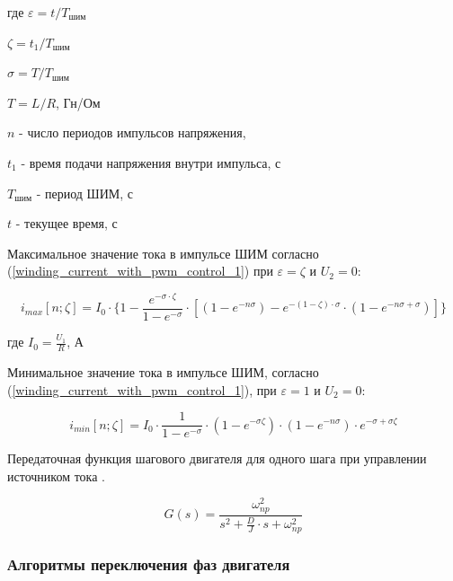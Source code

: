 где $\varepsilon = t / T_\textit{шим}$

$\zeta = t_{1} / T_\textit{шим}$

$\sigma = T / T_\textit{шим}$

$T = L / R$, Гн/Ом

$n$ - число периодов импульсов напряжения,

$t_{1}$ - время подачи напряжения внутри импульса, с

$T_\textit{шим}$ - период ШИМ, с

$t$ - текущее время, с

Максимальное значение тока в импульсе ШИМ согласно (\ref{winding_current_with_pwm_control_1}) при
$\varepsilon = \zeta$ и $U_{2} = 0$:

\begin{equation}
    \label{max_current_in_the_n_pwm_pulse}
    i_{max}[n; \zeta] =
        I_{0}
            \cdot \{ 1
                     - \frac{ e^{-\sigma \cdot \zeta} }{ 1 - e^{-\sigma} }
                       \cdot [ (1 - e^{-n\sigma})
                               - e^{ -(1 - \zeta) \cdot \sigma }
                                    \cdot ( 1 - e^{-n\sigma + \sigma} )
                             ]
                  \}
\end{equation}

где $I_{0} = \frac{ U_{1} }{ R }$, А

Минимальное значение тока в импульсе ШИМ, согласно (\ref{winding_current_with_pwm_control_1}), при
$\varepsilon = 1$ и $U_{2} = 0$:

\begin{equation}
    \label{min_current_in_the_n_pwm_pulse}
    i_{min}[n; \zeta] =
        I_{0}
            \cdot \frac{ 1 }{ 1-e^{-\sigma} }
            \cdot (1 - e^{-\sigma\zeta})
            \cdot (1 - e^{-n\sigma})
            \cdot e^{-\sigma + \sigma\zeta}
\end{equation}

Передаточная функция шагового двигателя для одного шага при управлении источником
тока \cite[гл. 4.2, ф-ла 4.65]{Kenio}.

\begin{equation}
    \label{step_motor_transfer_function}
    G(s) = \frac{ \omega_{np}^{2} }
                { s^{2} + \frac{D}{J} \cdot s + \omega_{np}^{2} }
\end{equation}

\newpage
\subsubsection{Алгоритмы переключения фаз двигателя}
\label{sec_step_control_algos}

